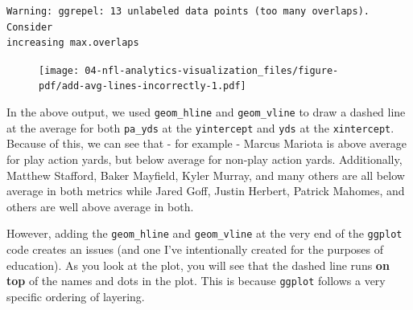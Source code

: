 \documentclass[
  letterpaper,
]{krantz}
\newenvironment{Shaded}{\begin{snugshade}}{\end{snugshade}}
\newcommand{\AttributeTok}[1]{\textcolor[rgb]{0.40,0.45,0.13}{#1}}
\newcommand{\DecValTok}[1]{\textcolor[rgb]{0.68,0.00,0.00}{#1}}
\newcommand{\FunctionTok}[1]{\textcolor[rgb]{0.28,0.35,0.67}{#1}}
\newcommand{\NormalTok}[1]{\textcolor[rgb]{0.00,0.23,0.31}{#1}}
\newcommand{\SpecialCharTok}[1]{\textcolor[rgb]{0.37,0.37,0.37}{#1}}
\newcommand{\StringTok}[1]{\textcolor[rgb]{0.13,0.47,0.30}{#1}}
\begin{document}
\begin{Shaded}
\end{Shaded}

\begin{verbatim}
Warning: ggrepel: 13 unlabeled data points (too many overlaps). Consider
increasing max.overlaps
\end{verbatim}

\begin{figure}[H]

{\centering \texttt{[image: 04-nfl-analytics-visualization\_files/figure-pdf/add-avg-lines-incorrectly-1.pdf]}

}

\end{figure}

In the above output, we used \texttt{geom\_hline} and
\texttt{geom\_vline} to draw a dashed line at the average for both
\texttt{pa\_yds} at the \texttt{yintercept} and \texttt{yds} at the
\texttt{xintercept}. Because of this, we can see that - for example -
Marcus Mariota is above average for play action yards, but below average
for non-play action yards. Additionally, Matthew Stafford, Baker
Mayfield, Kyler Murray, and many others are all below average in both
metrics while Jared Goff, Justin Herbert, Patrick Mahomes, and others
are well above average in both.

However, adding the \texttt{geom\_hline} and \texttt{geom\_vline} at the
very end of the \texttt{ggplot} code creates an issues (and one I've
intentionally created for the purposes of education). As you look at the
plot, you will see that the dashed line runs \textbf{on top} of the
names and dots in the plot. This is because \texttt{ggplot} follows a
very specific ordering of layering.
\end{document}
